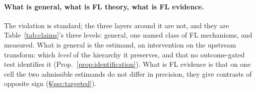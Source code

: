 \documentclass{article}
\begin{document}
\paragraph{What is general, what is FL theory, what is FL evidence.} The violation is standard; the three layers around it are not, and they are Table~\ref{tab:claims}'s three levels: general, one named class of FL mechanisms, and measured. What is general is the estimand, an intervention on the upstream transform: which \emph{level} of the hierarchy it preserves, and that no outcome-gated test identifies it (Prop.~\ref{prop:identification}). What is FL evidence is that on one cell the two admissible estimands do not differ in precision, they give contrasts of opposite sign (§\ref{sec:targeted}).
\end{document}
